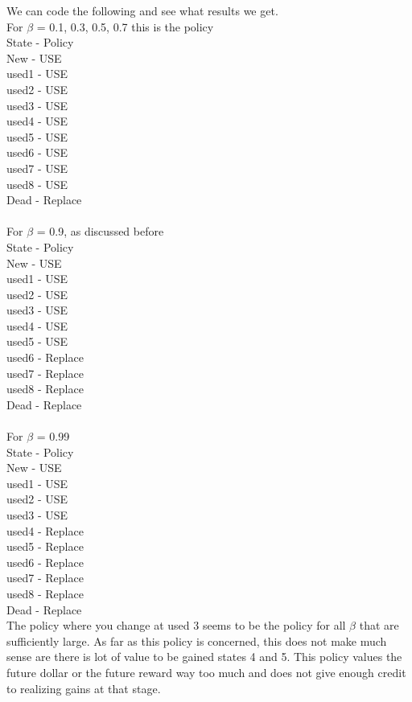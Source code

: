 \documentclass[11pt]{scrartcl} %
\begin{document}
We can code the following and see what results we get.\\
For $\beta$ = 0.1, 0.3, 0.5, 0.7 this is the policy\\
State - Policy\\
New - USE\\
used1 - USE\\
used2 - USE\\
used3 - USE\\
used4 - USE\\
used5 - USE\\
used6 - USE\\
used7 - USE\\
used8 - USE\\
Dead  - Replace\\
\vspace{2em}\\
For $\beta$ = 0.9, as discussed before \\
State - Policy\\
New - USE\\
used1 - USE\\
used2 - USE\\
used3 - USE\\
used4 - USE\\
used5 - USE\\
used6 - Replace\\
used7 - Replace\\
used8 - Replace\\
Dead  - Replace\\
\vspace{2em}\\
For $\beta$ = 0.99\\
State - Policy\\
New - USE\\
used1 - USE\\
used2 - USE\\
used3 - USE\\
used4 - Replace\\
used5 - Replace\\
used6 - Replace\\
used7 - Replace\\
used8 - Replace\\
Dead  - Replace\\

The policy where you change at used 3 seems to be the policy for all $\beta$ that are sufficiently large. As far as this policy is concerned, this does not make much sense are there is lot of value to be gained states 4 and 5. This policy values the future dollar or the future reward way too much and does not give enough credit to realizing gains at that stage.  
\end{document}
